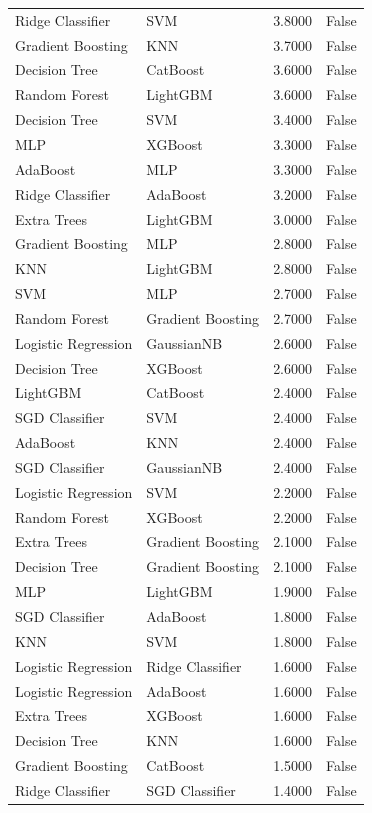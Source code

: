 \begin{tabular}{llrr}
Ridge Classifier & SVM & 3.8000 & False \\
Gradient Boosting & KNN & 3.7000 & False \\
Decision Tree & CatBoost & 3.6000 & False \\
Random Forest & LightGBM & 3.6000 & False \\
Decision Tree & SVM & 3.4000 & False \\
MLP & XGBoost & 3.3000 & False \\
AdaBoost & MLP & 3.3000 & False \\
Ridge Classifier & AdaBoost & 3.2000 & False \\
Extra Trees & LightGBM & 3.0000 & False \\
Gradient Boosting & MLP & 2.8000 & False \\
KNN & LightGBM & 2.8000 & False \\
SVM & MLP & 2.7000 & False \\
Random Forest & Gradient Boosting & 2.7000 & False \\
Logistic Regression & GaussianNB & 2.6000 & False \\
Decision Tree & XGBoost & 2.6000 & False \\
LightGBM & CatBoost & 2.4000 & False \\
SGD Classifier & SVM & 2.4000 & False \\
AdaBoost & KNN & 2.4000 & False \\
SGD Classifier & GaussianNB & 2.4000 & False \\
Logistic Regression & SVM & 2.2000 & False \\
Random Forest & XGBoost & 2.2000 & False \\
Extra Trees & Gradient Boosting & 2.1000 & False \\
Decision Tree & Gradient Boosting & 2.1000 & False \\
MLP & LightGBM & 1.9000 & False \\
SGD Classifier & AdaBoost & 1.8000 & False \\
KNN & SVM & 1.8000 & False \\
Logistic Regression & Ridge Classifier & 1.6000 & False \\
Logistic Regression & AdaBoost & 1.6000 & False \\
Extra Trees & XGBoost & 1.6000 & False \\
Decision Tree & KNN & 1.6000 & False \\
Gradient Boosting & CatBoost & 1.5000 & False \\
Ridge Classifier & SGD Classifier & 1.4000 & False \\

\end{tabular}
